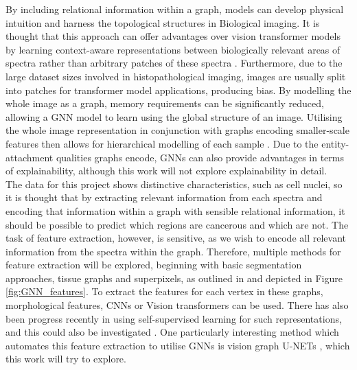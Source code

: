 By including relational information within a graph, models can develop physical intuition \cite{sanchez-gonzalez_graph_2018, sanchez-gonzalez_learning_2020} and harness the topological structures in Biological imaging. It is thought that this approach can offer advantages over vision transformer models by learning context-aware representations between biologically relevant areas of spectra rather than arbitrary patches of these spectra \cite{brussee_graph_2024}. Furthermore, due to the large dataset sizes involved in histopathological imaging, images are usually split into patches for transformer model applications, producing bias. By modelling the whole image as a graph, memory requirements can be significantly reduced, allowing a GNN model to learn using the global structure of an image. Utilising the whole image representation in conjunction with graphs encoding smaller-scale features then allows for hierarchical modelling of each sample \cite{brussee_graph_2024}. Due to the entity-attachment qualities graphs encode, GNNs can also provide advantages in terms of explainability, although this work will not explore explainability in detail.\\


The data for this project shows distinctive characteristics, such as cell nuclei, so it is thought that by extracting relevant information from each spectra and encoding that information within a graph with sensible relational information, it should be possible to predict which regions are cancerous and which are not. The task of feature extraction, however, is sensitive, as we wish to encode all relevant information from the spectra within the graph. Therefore, multiple methods for feature extraction will be explored, beginning with basic segmentation approaches, tissue graphs and superpixels, as outlined in \cite{brussee_graph_2024} and depicted in Figure \ref{fig:GNN_features}. To extract the features for each vertex in these graphs, morphological features, CNNs or Vision transformers can be used. There has also been progress recently in using self-supervised learning for such representations, and this could also be investigated \cite{tendle_study_2021}. One particularly interesting method which automates this feature extraction to utilise GNNs is vision graph U-NETs \cite{jiang_vision_2024}, which this work will try to explore.

